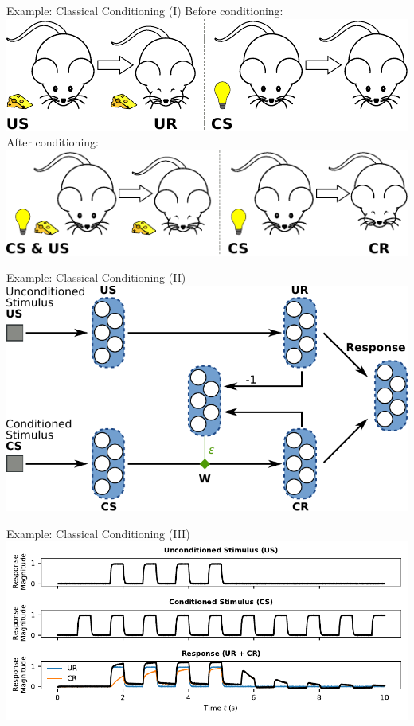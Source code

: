 \documentclass[handout,aspectratio=169]{beamer}
\begin{document}
	\begin{frame}{Example: Classical Conditioning (I)}
		\centering
		Before conditioning:\\[0.125cm]
		\includegraphics{media/classical_conditioning_a.pdf}\\[0.5cm]
		After conditioning:\\[0.125cm]
		\includegraphics{media/classical_conditioning_b.pdf}\\[0.5cm]
	\end{frame}

	\begin{frame}{Example: Classical Conditioning (II)}
		\centering
		\vspace{0.25cm}
		\includegraphics{media/conditioning_network.pdf}
	\end{frame}

	\begin{frame}{Example: Classical Conditioning (III)}
		\centering
		\includegraphics[width=\textwidth]{media/classical_conditioning_experiment.pdf}
	\end{frame}
\end{document}
